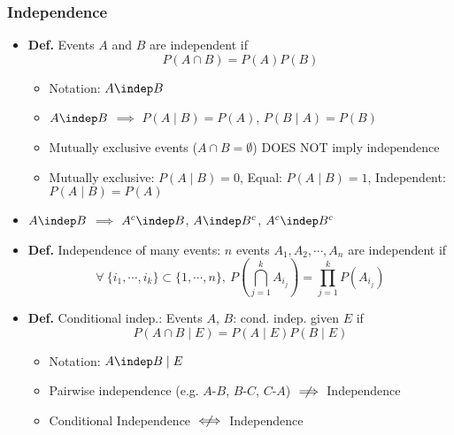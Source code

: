 \subsubsection*{Independence}
\begin{itemize}
    \item \textbf{Def.} Events $A$ and $B$ are independent if
    \begin{equation}
        P(A\cap B)=P(A)P(B)
    \end{equation}
    \begin{itemize}
        \item Notation: $A\indep B$
        \item $A\indep B$ $\implies$ $P(A\mid B)=P(A)$, $P(B\mid A)=P(B)$
        \item Mutually exclusive events ($A\cap B=\emptyset$) DOES NOT imply independence
        \item Mutually exclusive: $P(A\mid B)=0$, Equal: $P(A\mid B)=1$, Independent: $P(A\mid B)=P(A)$
    \end{itemize}
    \item $A\indep B$ $\implies$ $A^c\indep B$, $A\indep B^c$, $A^c\indep B^c$
    \item \textbf{Def.} Independence of many events: $n$ events $A_1,A_2,\cdots,A_n$ are independent if
    \begin{equation}
        \forall~\{i_1,\cdots,i_k\}\subset\{1,\cdots,n\},~P\left(\bigcap_{j=1}^kA_{i_j}\right)=\prod_{j=1}^kP(A_{i_j})
    \end{equation}
    \item \textbf{Def.} Conditional indep.: Events $A$, $B$: cond. indep. given $E$ if
    \begin{equation}
        P(A\cap B\mid E)=P(A\mid E)P(B\mid E)
    \end{equation}
    \begin{itemize}
        \item Notation: $A\indep B\mid E$
        \item Pairwise independence (e.g. $A$-$B$, $B$-$C$, $C$-$A$) $\centernot\implies$ Independence
        \item Conditional Independence $\centernot\iff$ Independence
    \end{itemize}
\end{itemize}
